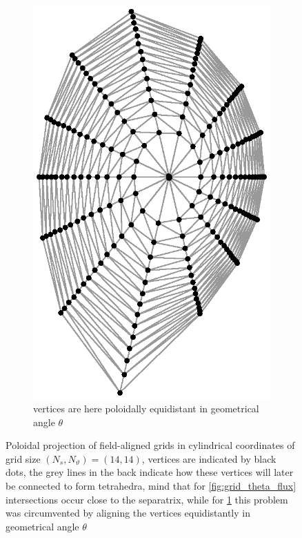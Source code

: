\documentclass[./main.tex]{subfiles}
\begin{document}
\begin{figure}[ht!]
\begin{subfigure}[b]{0.45\textwidth}
		\includegraphics[width=1.0\textwidth]{figures/grid_geom_theta_meshed.eps}
		\captionsetup{width=1\textwidth}
		\caption{vertices are here poloidally equidistant in geometrical angle $\theta$}
		\label{fig:grid_theta_geom}
	\end{subfigure}\hfill
		\caption{Poloidal projection of field-aligned grids in cylindrical coordinates of grid size $(N_s,N_\vartheta) = (14,14)$, vertices are indicated by black dots, the grey lines in the back indicate how these vertices will later be connected to form tetrahedra, mind that for \ref{fig:grid_theta_flux} intersections occur close to the separatrix, while for \ref{fig:grid_theta_geom} this problem was circumvented by aligning the vertices equidistantly in geometrical angle $\theta$}
\label{fig:grid_theta_flux_geom}
\end{figure}
\end{document}
